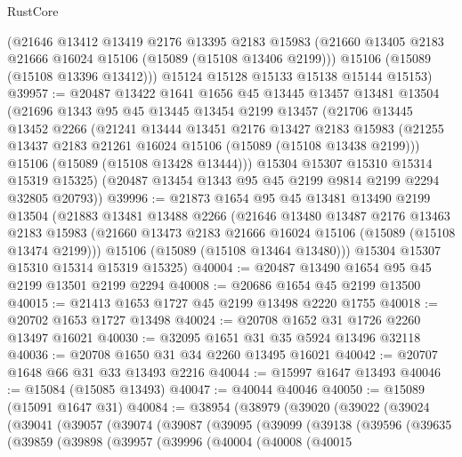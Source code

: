 \begin{lexlean}{RustCore}
\begin{coremodule}
      (@21646
        @13412
        @13419
        @2176
        @13395
        @2183
        @15983
        (@21660 @13405 @2183 @21666 @16024 @15106 (@15089 (@15108 @13406 @2199)))
        @15106
        (@15089 (@15108 @13396 @13412)))
      @15124
      @15128
      @15133
      @15138
      @15144
      @15153)
@39957 := @20487
    @13422
    @1641
    @1656
    @45
    @13445
    @13457
    @13481
    @13504
    (@21696
      @1343
      @95
      @45
      @13445
      @13454
      @2199
      @13457
      (@21706
        @13445
        @13452
        @2266
        (@21241
          @13444
          @13451
          @2176
          @13427
          @2183
          @15983
          (@21255 @13437 @2183 @21261 @16024 @15106 (@15089 (@15108 @13438 @2199)))
          @15106
          (@15089 (@15108 @13428 @13444)))
        @15304
        @15307
        @15310
        @15314
        @15319
        @15325)
      (@20487 @13454 @1343 @95 @45 @2199 @9814 @2199 @2294 @32805 @20793))
@39996 := @21873
    @1654
    @95
    @45
    @13481
    @13490
    @2199
    @13504
    (@21883
      @13481
      @13488
      @2266
      (@21646
        @13480
        @13487
        @2176
        @13463
        @2183
        @15983
        (@21660 @13473 @2183 @21666 @16024 @15106 (@15089 (@15108 @13474 @2199)))
        @15106
        (@15089 (@15108 @13464 @13480)))
      @15304
      @15307
      @15310
      @15314
      @15319
      @15325)
@40004 := @20487 @13490 @1654 @95 @45 @2199 @13501 @2199 @2294
@40008 := @20686 @1654 @45 @2199 @13500
@40015 := @21413 @1653 @1727 @45 @2199 @13498 @2220 @1755
@40018 := @20702 @1653 @1727 @13498
@40024 := @20708 @1652 @31 @1726 @2260 @13497 @16021
@40030 := @32095 @1651 @31 @35 @5924 @13496 @32118
@40036 := @20708 @1650 @31 @34 @2260 @13495 @16021
@40042 := @20707 @1648 @66 @31 @33 @13493 @2216
@40044 := @15997 @1647 @13493
@40046 := @15084 (@15085 @13493)
@40047 := @40044 @40046
@40050 := @15089 (@15091 @1647 @31)
@40084 := @38954
    (@38979
      (@39020
        (@39022
          (@39024
            (@39041
              (@39057
                (@39074
                  (@39087
                    (@39095
                      (@39099
                        (@39138
                          (@39596
                            (@39635
                              (@39859
                                (@39898
                                  (@39957
                                    (@39996
                                      (@40004
                                        (@40008
                                          (@40015

\end{coremodule}
\end{lexlean}

